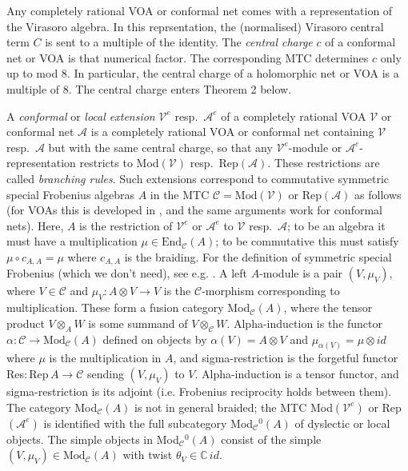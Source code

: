 \documentclass[12pt]{article}
\numberwithin{equation}{section}
\def\cA            {{\mathcal{A}}}
\def\cC            {{\mathcal{C}}}
\def\cV            {{\mathcal{V}}}
\def\bbC           {\mathbb{C}}
\begin{document}
Any completely rational VOA or conformal net comes with a representation of the Virasoro algebra. In this reprsentation, the (normalised) Virasoro central term $C$ is sent to a multiple of the identity. The \textit{central charge}  $c$ of a conformal net or VOA is that numerical factor.
The corresponding MTC determines $c$ only up to mod 8. In particular, the central charge of a 
holomorphic net or VOA is a multiple of 8. The central charge enters Theorem 2 below. 


A \textit{conformal} or \textit{local extension} $\cV^e$ resp.\ $\cA^e$ of a completely rational VOA $\cV$ or conformal net $\cA$ is a completely rational VOA or conformal net containing 
$\cV$ resp.\ $\cA$ but with the same central charge, so that  any $\cV^e$-module or $\cA^e$-representation restricts to  Mod$(\cV)$ resp.\ Rep$(\cA)$. These restrictions are called \textit{branching rules}. Such extensions correspond to commutative symmetric special Frobenius  algebras $A$ in the MTC $\cC=\mathrm{Mod}(\cV)$ or Rep$(\cA)$ as follows (for VOAs this is developed in \cite{KO,HKL,CKM}, and the same arguments work for conformal nets). Here, $A$ is the restriction of $\cV^e$ or $\cA^e$ to
$\cV$ resp.\ $\cA$; to be an algebra it must have a multiplication $\mu\in\mathrm{End}_{\cC}(A)$; to be commutative this must satisfy $\mu\circ c_{A,A}=\mu$ where  $c_{A,A}$ is the braiding. For the definition of symmetric special Frobenius (which we don't need), see e.g. \cite{FFSS}.  A left $A$-module is a pair
$(V,\mu_V)$, where $V\in\cC$ and $\mu_V:A\otimes V\rightarrow V$ is the $\cC$-morphism corresponding to multiplication. These form a 
 fusion category  Mod$_\cC(A)$, where the tensor product $V\otimes_A W$ is some summand of $V\otimes_{\cC} W$. Alpha-induction is the functor $\alpha:\cC\rightarrow \mathrm{Mod}_\cC(A)$ defined on objects by $\alpha(V)=A\otimes V$ and
$\mu_{\alpha(V)}=\mu\otimes id$ where $\mu$ is the multiplication in $A$, and sigma-restriction is the forgetful functor
Res$:\mathrm{Rep}\,A\rightarrow \cC$ sending $(V,\mu_V)$ to $V$. {Alpha-induction is a tensor functor, and sigma-restriction is its adjoint (i.e. Frobenius reciprocity holds between them)}.  The category
Mod$_\cC(A)$ is not in general braided; the MTC Mod$(\cV^e)$ or Rep$(\cA^e)$ is identified with the full subcategory Mod$_\cC{}^0(A)$ 
of dyslectic {or local} objects. The simple
objects in Mod$_\cC{}^0(A)$ consist of the simple $(V,\mu_V)\in\mathrm{Mod}_\cC(A)$ with twist $\theta_V\in\bbC\,id$.
\end{document}
